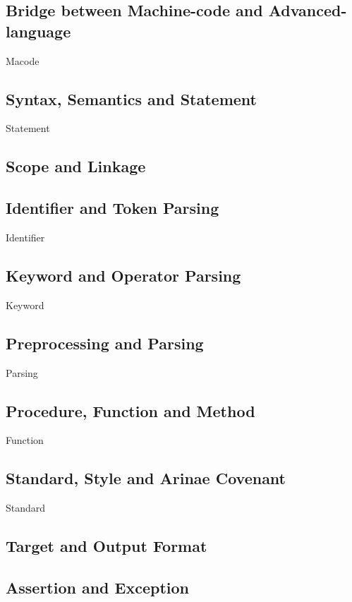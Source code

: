 
\subsection{Bridge between Machine-code and Advanced-language}
{Macode}

\subsection{Syntax, Semantics and Statement} %
{Statement}

\subsection{Scope and Linkage}

\subsection{Identifier and Token Parsing}
{Identifier}

\subsection{Keyword and Operator Parsing}
{Keyword}


\subsection{Preprocessing and Parsing}
{Parsing}

\subsection{Procedure, Function and Method}
{Function}

\subsection{Standard, Style and Arinae Covenant}
{Standard}

\subsection{Target and Output Format}



\subsection{Assertion and Exception}


